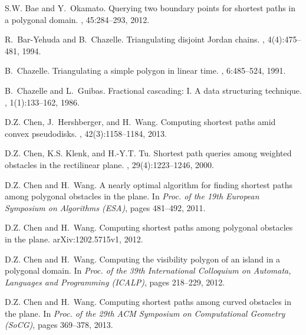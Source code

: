 \documentclass[english,runningheads,11pt]{llncs}
\begin{document}


\begin{thebibliography}{10}

S.W. Bae and Y.~Okamato.
\newblock Querying two boundary points for shortest paths in a polygonal
  domain.
, 45:284--293,
  2012.

R.~Bar-Yehuda and B.~Chazelle.
\newblock Triangulating disjoint {Jordan} chains.
, 4(4):475--481, 1994.

B.~Chazelle.
\newblock Triangulating a simple polygon in linear time.
, 6:485--524, 1991.

B.~Chazelle and L.~Guibas.
\newblock Fractional cascading: {I. A} data structuring technique.
, 1(1):133--162, 1986.

D.Z. Chen, J.~Hershberger, and H.~Wang.
\newblock Computing shortest paths amid convex pseudodisks.
, 42(3):1158--1184, 2013.

D.Z. Chen, K.S. Klenk, and H.-Y.T. Tu.
\newblock Shortest path queries among weighted obstacles in the rectilinear
  plane.
, 29(4):1223--1246, 2000.

D.Z. Chen and H.~Wang.
\newblock A nearly optimal algorithm for finding {} shortest paths among
  polygonal obstacles in the plane.
\newblock In {\em Proc. of the 19th European Symposium on Algorithms (ESA)},
  pages 481--492, 2011.

D.Z. Chen and H.~Wang.
\newblock Computing {} shortest paths among polygonal obstacles in the
  plane.
\newblock arXiv:1202.5715v1, 2012.

D.Z. Chen and H.~Wang.
\newblock Computing the visibility polygon of an island in a polygonal domain.
\newblock In {\em Proc. of the 39th International Colloquium on Automata,
  Languages and Programming (ICALP)}, pages 218--229, 2012.

D.Z. Chen and H.~Wang.
\newblock Computing shortest paths among curved obstacles in the plane.
\newblock In {\em Proc. of the 29th ACM Symposium on Computational Geometry
  (SoCG)}, pages 369--378, 2013.


\end{thebibliography}
\end{document}
